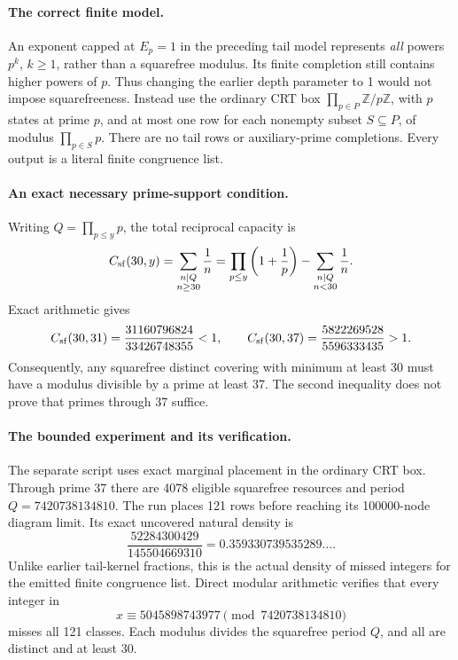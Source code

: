 \documentclass[11pt]{article}
\newcommand{\Z}{\mathbb Z}
\begin{document}
\paragraph{The correct finite model.}
An exponent capped at $E_p=1$ in the preceding tail model represents
\emph{all} powers $p^k$, $k\ge1$, rather than a squarefree modulus.
Its finite completion still contains higher powers of $p$. Thus changing
the earlier depth parameter to 1 would not impose squarefreeness.
Instead use the ordinary CRT box $\prod_{p\in P}\Z/p\Z$, with $p$ states
at prime $p$, and at most one row for each nonempty subset $S\subseteq P$,
of modulus $\prod_{p\in S}p$. There are no tail rows or auxiliary-prime
completions. Every output is a literal finite congruence list.

\paragraph{An exact necessary prime-support condition.}
Writing $Q=\prod_{p\le y}p$, the total reciprocal capacity is
\[
 C_{\rm sf}(30,y)=\sum_{\substack{n\mid Q\\n\ge30}}\frac1n
 =\prod_{p\le y}\left(1+\frac1p\right)
  -\sum_{\substack{n\mid Q\\n<30}}\frac1n.
\]
Exact arithmetic gives
\[
 C_{\rm sf}(30,31)=\frac{31160796824}{33426748355}<1,
 \qquad
 C_{\rm sf}(30,37)=\frac{5822269528}{5596333435}>1.
\]
Consequently, any squarefree distinct covering with minimum at least 30
must have a modulus divisible by a prime at least 37. The second inequality
does not prove that primes through 37 suffice.

\paragraph{The bounded experiment and its verification.}
The separate script  uses
exact marginal placement in the ordinary CRT box. Through prime 37 there
are 4078 eligible squarefree resources and period $Q=7420738134810$.
The run places 121 rows before reaching its 100000-node diagram limit.
Its exact uncovered natural density is
\[
 \frac{52284300429}{145504669310}=0.359330739535289\ldots.
\]
Unlike earlier tail-kernel fractions, this is the actual density of missed
integers for the emitted finite congruence list. Direct modular arithmetic
verifies that every integer in
\[
 x\equiv5045898743977\pmod{7420738134810}
\]
misses all 121 classes. Each modulus divides the squarefree period $Q$,
and all are distinct and at least 30.
\end{document}
